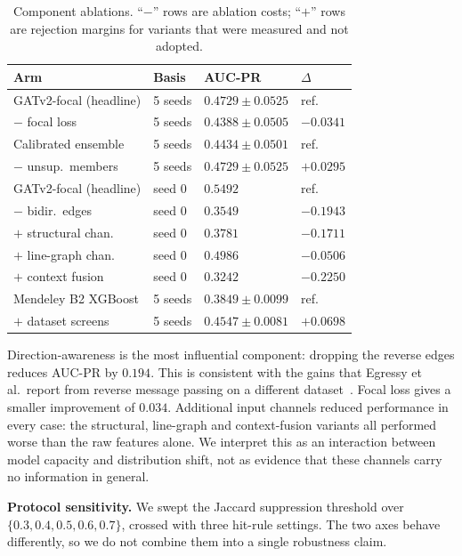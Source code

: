 \documentclass[conference]{IEEEtran}
\begin{document}
\begin{table}[t]
\caption{Component ablations. ``$-$'' rows are ablation costs; ``$+$'' rows
are rejection margins for variants that were measured and not adopted.}
\label{tab:t7}
\centering
\footnotesize
\setlength{\tabcolsep}{3.5pt}
\begin{tabular}{llll}
\toprule
Arm & Basis & AUC-PR & $\Delta$ \\
\midrule
GATv2-focal (headline) & 5 seeds & $0.4729 \pm 0.0525$ & ref. \\
\quad $-$ focal loss & 5 seeds & $0.4388 \pm 0.0505$ & $-0.0341$ \\
Calibrated ensemble & 5 seeds & $0.4434 \pm 0.0501$ & ref. \\
\quad $-$ unsup.\ members & 5 seeds & $0.4729 \pm 0.0525$ & $+0.0295$ \\
GATv2-focal (headline) & seed 0 & $0.5492$ & ref. \\
\quad $-$ bidir.\ edges & seed 0 & $0.3549$ & $\mathbf{-0.1943}$ \\
\quad $+$ structural chan. & seed 0 & $0.3781$ & $-0.1711$ \\
\quad $+$ line-graph chan. & seed 0 & $0.4986$ & $-0.0506$ \\
\quad $+$ context fusion & seed 0 & $0.3242$ & $-0.2250$ \\
Mendeley B2 XGBoost & 5 seeds & $0.3849 \pm 0.0099$ & ref. \\
\quad $+$ dataset screens & 5 seeds & $0.4547 \pm 0.0081$ & $+0.0698$ \\
\bottomrule
\end{tabular}
\end{table}

Direction-awareness is the most influential component: dropping the reverse
edges reduces AUC-PR by $0.194$. This is consistent with the gains that
Egressy et al.\ report from reverse message passing on a different dataset~\cite{egressy2024}.
Focal loss gives a smaller improvement of $0.034$. Additional input channels
reduced performance in every case: the structural, line-graph and
context-fusion variants all performed worse than the raw features alone. We
interpret this as an interaction between model capacity and distribution
shift, not as evidence that these channels carry no information in
general.


\textbf{Protocol sensitivity.} We swept the Jaccard suppression threshold over
$\{0.3, 0.4, 0.5, 0.6, 0.7\}$, crossed with three hit-rule settings. The two
axes behave differently, so we do not combine them into a single robustness
claim.
\end{document}
